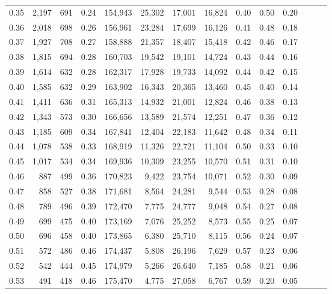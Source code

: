 \begin{tabular}{rrrrrrrrrrrrrr}
0.35 &  2,197 &  691 &  0.24 &  154,943 &   25,302 &  17,001 &  16,824 &  0.40 &  0.50 &      0.20 \\
0.36 &  2,018 &  698 &  0.26 &  156,961 &   23,284 &  17,699 &  16,126 &  0.41 &  0.48 &      0.18 \\
0.37 &  1,927 &  708 &  0.27 &  158,888 &   21,357 &  18,407 &  15,418 &  0.42 &  0.46 &      0.17 \\
0.38 &  1,815 &  694 &  0.28 &  160,703 &   19,542 &  19,101 &  14,724 &  0.43 &  0.44 &      0.16 \\
0.39 &  1,614 &  632 &  0.28 &  162,317 &   17,928 &  19,733 &  14,092 &  0.44 &  0.42 &      0.15 \\
0.40 &  1,585 &  632 &  0.29 &  163,902 &   16,343 &  20,365 &  13,460 &  0.45 &  0.40 &      0.14 \\
0.41 &  1,411 &  636 &  0.31 &  165,313 &   14,932 &  21,001 &  12,824 &  0.46 &  0.38 &      0.13 \\
0.42 &  1,343 &  573 &  0.30 &  166,656 &   13,589 &  21,574 &  12,251 &  0.47 &  0.36 &      0.12 \\
0.43 &  1,185 &  609 &  0.34 &  167,841 &   12,404 &  22,183 &  11,642 &  0.48 &  0.34 &      0.11 \\
0.44 &  1,078 &  538 &  0.33 &  168,919 &   11,326 &  22,721 &  11,104 &  0.50 &  0.33 &      0.10 \\
0.45 &  1,017 &  534 &  0.34 &  169,936 &   10,309 &  23,255 &  10,570 &  0.51 &  0.31 &      0.10 \\
0.46 &    887 &  499 &  0.36 &  170,823 &    9,422 &  23,754 &  10,071 &  0.52 &  0.30 &      0.09 \\
0.47 &    858 &  527 &  0.38 &  171,681 &    8,564 &  24,281 &   9,544 &  0.53 &  0.28 &      0.08 \\
0.48 &    789 &  496 &  0.39 &  172,470 &    7,775 &  24,777 &   9,048 &  0.54 &  0.27 &      0.08 \\
0.49 &    699 &  475 &  0.40 &  173,169 &    7,076 &  25,252 &   8,573 &  0.55 &  0.25 &      0.07 \\
0.50 &    696 &  458 &  0.40 &  173,865 &    6,380 &  25,710 &   8,115 &  0.56 &  0.24 &      0.07 \\
0.51 &    572 &  486 &  0.46 &  174,437 &    5,808 &  26,196 &   7,629 &  0.57 &  0.23 &      0.06 \\
0.52 &    542 &  444 &  0.45 &  174,979 &    5,266 &  26,640 &   7,185 &  0.58 &  0.21 &      0.06 \\
0.53 &    491 &  418 &  0.46 &  175,470 &    4,775 &  27,058 &   6,767 &  0.59 &  0.20 &      0.05 \\

\end{tabular}
